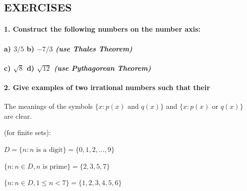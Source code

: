 \documentclass[11pt]{amsbook}
\begin{document}
\subsection{EXERCISES}
\paragraph{}

\paragraph{\hspace{0.5cm}1. Construct the following numbers on the number axis:}

\paragraph{\hspace{1.5cm}a) $3/5$\hspace{2.6cm}	b) $-7/3$\hspace{0.6cm} \emph{(use Thales Theorem)}}

\paragraph{\hspace{1.5cm}c) $\sqrt{8}$\hspace{2.8cm}	d) $\sqrt{12}$ \hspace{0.8cm}\emph{(use Pythagorean Theorem)}}

\paragraph{}
\paragraph{\hspace{0.5cm}2. Give examples of two irrational numbers such that their}



The meanings of the symbols
$ \{ x: p(x) \text{ and } q(x) \} $
and
$ \{x: p(x) \text{ or } q(x)\} $
are clear.

\begin{exmp} 
	(for finite sets):
	
	\begin{hEnumerateArabic}	 
		\item
		$ D = \{ n: n \text{ is a digit} \} = \{ 0, 1, 2, \dotsc, 9 \} $
	 
		\item
		$ \{ n: n \in D, n \text{ is prime} \} = \{ 2, 3, 5, 7 \} $
	 
		\item
		$ \{ n: n \in D, 1 \leq n < 7 \} = \{ 1, 2, 3, 4, 5, 6 \} $	 
	\end{hEnumerateArabic} 
\end{exmp}
\end{document}
